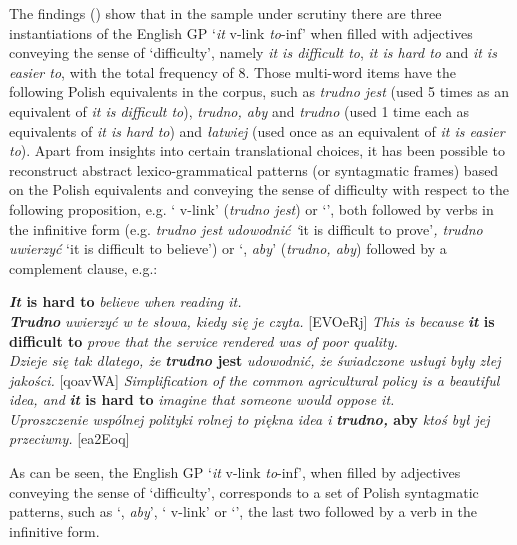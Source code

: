 \documentclass[output=paper]{langscibook}
\begin{document}
The findings () show that in the sample under scrutiny there are three  instantiations of the English GP ‘\textit{it} v-link {\ADJ} \textit{to}{}-inf’ when filled with adjectives conveying the sense of ‘difficulty’, namely \textit{it is difficult to}, \textit{it is hard to} and \textit{it is easier to}, with the total frequency of 8. Those multi-word items have the following Polish equivalents in the corpus, such as \textit{trudno jest} (used 5 times as an equivalent of \textit{it is difficult to}), \textit{trudno, aby} and \textit{trudno} (used 1 time each as equivalents of \textit{it is hard to}) and \textit{łatwiej} (used once as an equivalent of \textit{it is easier to}). Apart from insights into certain translational choices, it has been possible to reconstruct abstract lexico-grammatical patterns (or syntagmatic frames) based on the Polish equivalents and conveying the sense of difficulty with respect to the following proposition, e.g. ‘{\ADV} v-link’ (\textit{trudno jest}) or ‘{\ADV}', both followed by verbs in the infinitive form (e.g. \textit{trudno jest udowodnić ‘}it is difficult to prove’\textit{, trudno uwierzyć} ‘it is difficult to believe’) or ‘{\ADV}, \textit{aby}’ (\textit{trudno, aby}) followed by a complement clause, e.g.:

\ea
\ea \textbf{\textit{It} \textbf{is} \textbf{hard} \textbf{to}} \textit{believe when reading it.}\\
\textbf{\textit{Trudno} }\textit{uwierzyć w te słowa, kiedy się je czyta.} [EVOeRj]
\ex \textit{This is because} \textbf{\textit{it} \textbf{is} \textbf{difficult} \textbf{to}} \textit{prove that the service rendered was of poor quality.}\\
\textit{Dzieje się tak dlatego, że} \textbf{\textit{trudno} \textbf{jest}} \textit{udowodnić, że świadczone usługi były złej jakości.} [qoavWA]
\ex \textit{Simplification of the common agricultural policy is a beautiful idea, and} \textbf{\textit{it} \textbf{is} \textbf{hard} \textbf{to}} \textit{imagine that someone would oppose it.}\\ 
\textit{Uproszczenie wspólnej polityki rolnej to piękna idea i} \textbf{\textit{trudno,} \textbf{aby}} \textit{ktoś był jej przeciwny.} [ea2Eoq]
\z
\z

As can be seen, the English GP ‘\textit{it} v-link {\ADJ} \textit{to}{}-inf’, when filled by adjectives conveying the sense of ‘difficulty’, corresponds to a set of Polish syntagmatic patterns, such as ‘{\ADV}, \textit{aby}’, ‘{\ADV} v-link’ or ‘{\ADV}’, the last two followed by a verb in the infinitive form.
\end{document}
